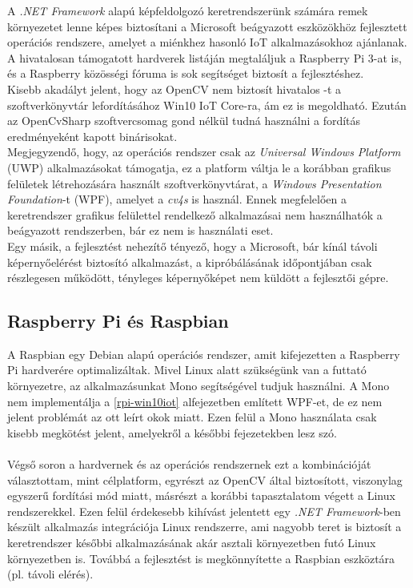 A \emph{.NET Framework} alapú képfeldolgozó keretrendszerünk számára remek környezetet lenne képes biztosítani a Microsoft beágyazott eszközökhöz fejlesztett operációs rendszere, amelyet a miénkhez hasonló IoT alkalmazásokhoz ajánlanak. A hivatalosan támogatott hardverek listáján megtaláljuk a Raspberry Pi 3-at is, és a Raspberry közösségi fóruma is sok segítséget biztosít a fejlesztéshez. \\
Kisebb akadályt jelent, hogy az OpenCV nem biztosít hivatalos -t a szoftverkönyvtár lefordításához Win10 IoT Core-ra, ám ez is megoldható. \cite{win10-compile} Ezután az OpenCvSharp szoftvercsomag gond nélkül tudná használni a fordítás eredményeként kapott binárisokat. \\
Megjegyzendő, hogy, az operációs rendszer csak az \emph{Universal Windows Platform} (UWP) alkalmazásokat támogatja, ez a platform váltja le a korábban grafikus felületek létrehozására használt szoftverkönyvtárat, a \emph{Windows Presentation Foundation}-t (WPF), amelyet a \emph{cv4s} is használ. Ennek megfelelően a keretrendszer grafikus felülettel rendelkező alkalmazásai nem használhatók a beágyazott rendszerben, bár ez nem is használati eset.\\
Egy másik, a fejlesztést nehezítő tényező, hogy a Microsoft, bár kínál távoli képernyőelérést biztosító alkalmazást, a kipróbálásának időpontjában csak részlegesen működött, tényleges képernyőképet nem küldött a fejlesztői gépre.

\subsection{Raspberry Pi és Raspbian}

A Raspbian egy Debian alapú operációs rendszer, amit kifejezetten a Raspberry Pi hardverére optimalizáltak. Mivel Linux alatt szükségünk van a futtató környezetre, az alkalmazásunkat Mono segítségével tudjuk használni. A Mono nem implementálja a \ref{rpi-win10iot} alfejezetben említett WPF-et, de ez nem jelent problémát az ott leírt okok miatt. Ezen felül a Mono használata csak kisebb megkötést jelent, amelyekről a későbbi fejezetekben lesz szó.\\
\\
Végső soron a hardvernek és az operációs rendszernek ezt a kombinációját választottam, mint célplatform, egyrészt az OpenCV által biztosított, viszonylag egyszerű fordítási mód miatt, másrészt a korábbi tapasztalatom végett a Linux rendszerekkel. Ezen felül érdekesebb kihívást jelentett egy \textit{.NET Framework}-ben készült alkalmazás integrációja Linux rendszerre, ami nagyobb teret is biztosít a keretrendszer későbbi alkalmazásának akár asztali környezetben futó Linux környezetben is. Továbbá a fejlesztést is megkönnyítette a Raspbian eszköztára (pl. távoli elérés).


